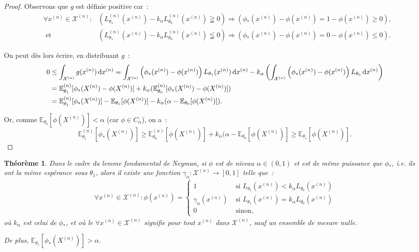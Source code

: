 \documentclass{report}
\newcommand{\E}{\mathbb E}
\newcommand{\n}{{(n)}}
\newtheorem{thm}{Théorème}[chapter]
\theoremstyle{definition}
\theoremstyle{remark}
\begin{document}
\begin{proof}
		Observons que $g$ est définie positive car~:
		\begin{align*}
			&\forall x^\n \in \mathcal X^\n : &\left(L_{\theta_1}^\n(x^\n) - k_\alpha L_{\theta_0}^\n(x^\n) \gneqq 0\right)
				\Rightarrow \left(\phi_*(x^\n) - \phi(x^\n) = 1 - \phi(x^\n) \geq 0\right), \\
			&\text{ et} &\left(L_{\theta_1}^\n(x^\n) - k_\alpha L_{\theta_0}^\n(x^\n) \lneqq 0\right) \Rightarrow
				\left(\phi_*(x^\n) - \phi(x^\n) = 0 - \phi(x^\n) \leq 0\right).
		\end{align*}

		On peut dès lors écrire, en distribuant $g$~:
		\begin{align*}
			0 &\leq \int_{\mathcal X^\n}g(x^\n)\dif x^\n = \int_{\mathcal X^\n}\left(\phi_*(x^\n)-\phi(x^\n)\right)L_{\theta_1}(x^\n)\dif x^\n
				- k_\alpha\left(\int_{\mathcal X^\n}\left(\phi_*(x^\n)-\phi(x^\n)\right)L_{\theta_0}\dif x^\n\right) \\
			&= \E_{\theta_1}^\n[\phi_*(X^\n) - \phi(X^\n)] + k_\alpha(\E_{\theta_0}^\n[\phi_*(X^\n)-\phi(X^\n)]) \\
			&= \E_{\theta_1}^\n[\phi_*(X^\n)] - \E_{\theta_1}[\phi(X^\n)] - k_\alpha(\alpha - \E_{\theta_0}[\phi(X^\n)]).
		\end{align*}

		Or, comme $\E_{\theta_0}[\phi(X^\n)] < \alpha$ (car $\phi \in C_\alpha$), on a~:
		\[\E_{\theta_1}^\n[\phi_*(X^\n)] \geq \E_{\theta_0}^\n[\phi(X^\n)] + k_\alpha(\alpha-\E_{\theta_0}[\phi(X^\n)] \geq \E_{\theta_1}[\phi(X^\n)].\]
		\end{proof}

		\begin{thm} Dans le cadre du lemme fondamental de Neyman, si $\phi$ est de niveau $\alpha \in (0, 1)$ et est de même puissance que $\phi_*$, i.e.
		ils ont la même espérance sous $\theta_1$, alors il existe une fonction $\gamma_\alpha : \mathcal X^\n \to [0, 1]$ telle que~:
		\begin{align*} \forall x^\n \in \mathcal X^\n : \phi(x^\n) =
			\begin{cases}
				1 &\text{ si } L_{\theta_1}(x^\n) < k_\alpha L_{\theta_0}(x^\n) \\
				\gamma_\alpha(x^\n) &\text{ si } L_{\theta_1}(x^\n) = k_\alpha L_{\theta_0}(x^\n) \\
				0 &\text{ sinon},
			\end{cases}
		\end{align*}
		où $k_\alpha$ est celui de $\phi_*$, et où le $\forall x^\n \in \mathcal X^\n$ signifie pour tout $x^\n$ dans $\mathcal X^\n$, sauf un ensemble
		de mesure nulle.

		De plus, $\E_{\theta_1}[\phi_*(X^\n)] > \alpha$.
		\end{thm}
\end{document}
